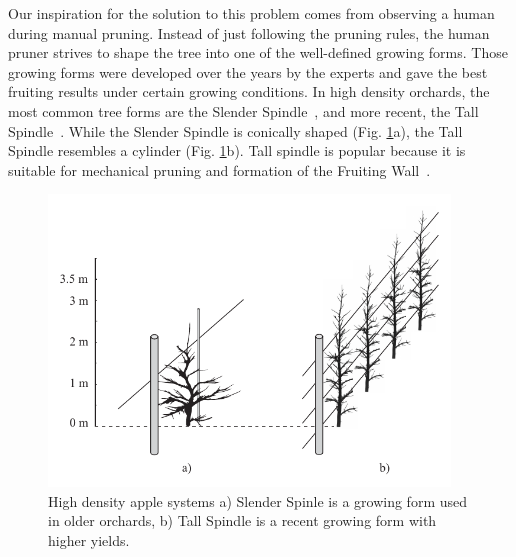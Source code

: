 Our inspiration for the solution to this problem comes from observing a
human during manual pruning. Instead of just following the pruning
rules, the human pruner strives to shape the tree into one of the
well-defined growing forms. Those growing forms were developed over the
years by the experts and gave the best fruiting results under certain
growing conditions. In high density orchards, the most common tree
forms are the Slender Spindle~\cite{weber_optimizing_2000}, and more recent, the Tall Spindle~\cite{robinson_vision_2013}. While the Slender Spindle is conically shaped (Fig. \ref{fig:my_figure2a}a),
the Tall Spindle resembles a cylinder (Fig. \ref{fig:my_figure2a}b). Tall spindle is popular because it is suitable for mechanical pruning and formation of the Fruiting Wall~\cite{robinson_vision_2013}.

\begin{figure}[hbt]
    \centering
    \includegraphics[width=4.2in]{figs/Fig3.pdf}
    \caption{High density apple systems a) Slender Spinle is a growing form used in older orchards, b) Tall Spindle is a recent growing form with higher yields.}
    \label{fig:my_figure2a}
\end{figure}

